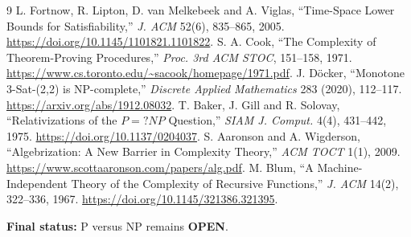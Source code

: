 \documentclass[11pt]{article}
\newcommand{\OPEN}{\textbf{OPEN}}
\begin{document}
\begin{thebibliography}{9}
 L. Fortnow, R. Lipton, D. van Melkebeek and A. Viglas,
``Time-Space Lower Bounds for Satisfiability,'' \emph{J. ACM} 52(6),
835--865, 2005. \url{https://doi.org/10.1145/1101821.1101822}.
 S. A. Cook, ``The Complexity of Theorem-Proving
Procedures,'' \emph{Proc. 3rd ACM STOC}, 151--158, 1971.
\url{https://www.cs.toronto.edu/~sacook/homepage/1971.pdf}.
 J. D\"ocker, ``Monotone 3-Sat-(2,2) is NP-complete,''
\emph{Discrete Applied Mathematics} 283 (2020), 112--117.
\url{https://arxiv.org/abs/1912.08032}.
 T. Baker, J. Gill and R. Solovay,
``Relativizations of the $P=?NP$ Question,'' \emph{SIAM J. Comput.} 4(4),
431--442, 1975. \url{https://doi.org/10.1137/0204037}.
 S. Aaronson and A. Wigderson,
``Algebrization: A New Barrier in Complexity Theory,'' \emph{ACM TOCT}
1(1), 2009. \url{https://www.scottaaronson.com/papers/alg.pdf}.
 M. Blum, ``A Machine-Independent Theory of the Complexity
of Recursive Functions,'' \emph{J. ACM} 14(2), 322--336, 1967.
\url{https://doi.org/10.1145/321386.321395}.
\end{thebibliography}

\noindent\textbf{Final status:} P versus NP remains \OPEN.

\end{document}
